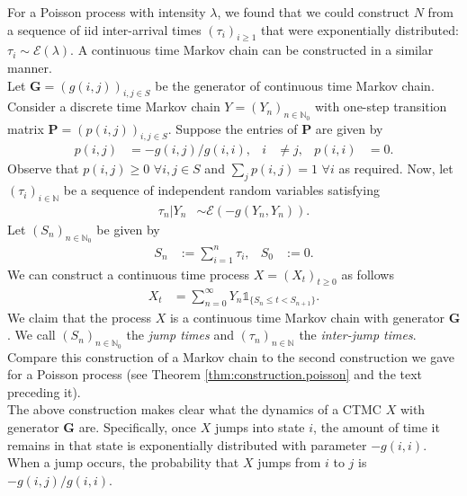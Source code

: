 \documentclass[12pt]{book}
\numberwithin{equation}{chapter}
\theoremstyle{plain}
\numberwithin{theorem}{section}
\theoremstyle{definition}
\numberwithin{exercise}{chapter}
\newcommand{\<}{\langle}
\renewcommand{\>}{\rangle}
\renewcommand{\(}{\left(}
\renewcommand{\)}{\right)}
\renewcommand{\[}{\left[}
\renewcommand{\]}{\right]}
\newcommand\Ib{\mathds{1}} 	%
\newcommand\Pb{\mathds{P}}
\newcommand\Nb{\mathds{N}}
\newcommand\Ec{\mathscr{E}}
\newcommand\lam{\lambda}
\newcommand\Gv{\pmb{G}}
\newcommand\Pv{\pmb{P}}
\begin{document}
\noindent
For a Poisson process with intensity $\lam$, we found that we could construct $N$ from a sequence of iid inter-arrival times $(\tau_i)_{i \geq 1}$ that were exponentially distributed: $\tau_i \sim \Ec(\lam)$.  A continuous time Markov chain can be constructed in a similar manner.  
\\[0.5em]
Let $\Gv = (g(i,j))_{i,j \in S}$ be the generator of continuous time Markov chain.
Consider a discrete time Markov chain $Y = (Y_n)_{n \in \Nb_0}$ with one-step transition matrix $\Pv = (p(i,j))_{i,j \in S}$.  Suppose the entries of $\Pv$ are given by
\begin{align}
p(i,j)
	&=	- g(i,j)/g(i,i) , &
i
	&\neq j , &
p(i,i)
	&=	0 .
\end{align}
Observe that $p(i,j) \geq 0$ $\forall i,j \in S$ and $\sum_j p(i,j) = 1$ $\forall i$ as required.
Now, let $(\tau_i)_{i \in \Nb}$ be a sequence of independent random variables satisfying
\begin{align}
\tau_n | Y_n
	&\sim \Ec( -g(Y_n,Y_n) ) .
\end{align}
Let $(S_n)_{n \in \Nb_0}$ be given by
\begin{align}
S_n
	&:=	\sum_{i=1}^n \tau_i , &
S_0
	&:=	0 .
\end{align}
We can construct a continuous time process $X = (X_t)_{t \geq 0}$ as follows
\begin{align}
X_t
	&=	\sum_{n=0}^\infty Y_n \Ib_{\{S_n \leq t < S_{n+1}\}} .
\end{align}
We claim that the process $X$ is a continuous time Markov chain with generator $\Gv$.  We call $(S_n)_{n \in \Nb_0}$ the \emph{jump times} and $(\tau_n)_{n \in \Nb}$ the \emph{inter-jump times}.  Compare this construction of a Markov chain to the second construction we gave for a Poisson process (see Theorem \ref{thm:construction.poisson} and the text preceding it).
\\[0.5em]
The above construction makes clear what the dynamics of a CTMC $X$ with generator $\Gv$ are.  Specifically, once $X$ jumps into state $i$, the amount of time it remains in that state is exponentially distributed with parameter $-g(i,i)$.  When a jump occurs, the probability that $X$ jumps from $i$ to $j$ is $-g(i,j)/g(i,i)$.
\end{document}
